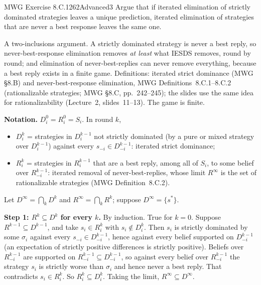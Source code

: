 \begin{exsol}{MWG Exercise 8.C.1}{262}{Advanced}{3}
\asked Argue that if iterated elimination of strictly dominated strategies leaves a unique
prediction, iterated elimination of strategies that are never a best response leaves the same one.

\method A two-inclusions argument. A strictly dominated strategy is never a best reply, so
never-best-response elimination removes \emph{at least} what IESDS removes, round by round; and
elimination of never-best-replies can never remove everything, because a best reply exists in a
finite game. Definitions: iterated strict dominance (MWG \S8.B) and never-best-response elimination,
MWG Definitions~8.C.1--8.C.2 (rationalizable strategies; MWG \S8.C, pp.~242--245); the slides use the same idea for
rationalizability (Lecture~2, slides~11--13). The game is finite.

\solution
\textbf{Notation.} $D^0_i = R^0_i = S_i$. In round $k$,
\begin{itemize}
  \item $D^k_i$ = strategies in $D^{k-1}_i$ not strictly dominated (by a pure or mixed strategy
  over $D^{k-1}_i$) against every $s_{-i} \in D^{k-1}_{-i}$: iterated strict dominance;
  \item $R^k_i$ = strategies in $R^{k-1}_i$ that are a best reply, among all of $S_i$, to some belief over
  $R^{k-1}_{-i}$: iterated removal of never-best-replies, whose limit $R^\infty$ is the set of
  rationalizable strategies (MWG Definition~8.C.2).
\end{itemize}
Let $D^\infty = \bigcap_k D^k$ and $R^\infty = \bigcap_k R^k$; suppose $D^\infty = \{s^*\}$.

\textbf{Step 1: $R^k \subseteq D^k$ for every $k$.} By induction. True for $k = 0$. Suppose
$R^{k-1} \subseteq D^{k-1}$, and take $s_i \in R^k_i$ with $s_i \notin D^k_i$. Then $s_i$ is strictly
dominated by some $\sigma_i$ against every $s_{-i} \in D^{k-1}_{-i}$, hence against every belief
supported on $D^{k-1}_{-i}$ (an expectation of strictly positive differences is strictly positive). Beliefs over $R^{k-1}_{-i}$ are supported on
$R^{k-1}_{-i} \subseteq D^{k-1}_{-i}$, so against every belief over $R^{k-1}_{-i}$ the strategy $s_i$ is
strictly worse than $\sigma_i$ and hence never a best reply. That contradicts $s_i \in R^k_i$. So
$R^k_i \subseteq D^k_i$. Taking the limit, $R^\infty \subseteq D^\infty$.


\end{exsol}
